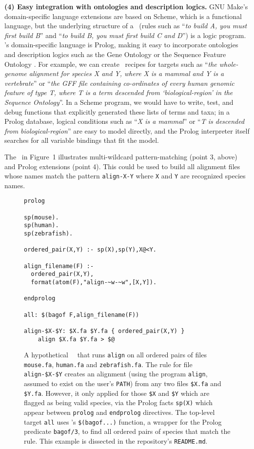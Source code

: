 {\bf (4) Easy integration with ontologies and description logics.}
GNU Make's domain-specific language extensions are based on Scheme, which is a functional language,
but the underlying structure of a \Makefile\ (rules such as ``{\em to build A, you must first build B}'' and ``{\em to build B, you must first build C and D}'')
is a logic program.
\biomake's domain-specific language is Prolog, making it easy to incorporate ontologies and description logics
such as the Gene Ontology \citep{GeneOntology2015} or the Sequence Feature Ontology \citep{SequenceOntology2005}.
For example, we can create \biomake\ recipes for targets such as ``{\em the whole-genome alignment for species X and Y, where X is a mammal and Y is a vertebrate}''
or ``{\em the GFF file containing co-ordinates of every human genomic feature of type T, where T is a term descended from `biological-region' in the Sequence Ontology}''.
In a Scheme program, we would have to write, test, and debug functions that explicitly generated these lists of terms and taxa;
in a Prolog database, logical conditions such as ``{\em X is a mammal}'' or ``{\em T is descended from biological-region}'' are easy to model directly,
and the Prolog interpreter itself searches for all variable bindings that fit the model.

The \Makefile\ in Figure~1 illustrates multi-wildcard pattern-matching (point 3, above) and Prolog extensions (point 4).
This could be used to build all alignment files whose names match the pattern {\tt align-X-Y} where {\tt X} and {\tt Y} are recognized species names.

\begin{figure}[H]
\begin{Verbatim}[frame=single]
prolog

sp(mouse).
sp(human).
sp(zebrafish).

ordered_pair(X,Y) :- sp(X),sp(Y),X@<Y.

align_filename(F) :-
  ordered_pair(X,Y),
  format(atom(F),"align-~w-~w",[X,Y]).

endprolog

all: $(bagof F,align_filename(F))

align-$X-$Y: $X.fa $Y.fa { ordered_pair(X,Y) }
    align $X.fa $Y.fa > $@
\end{Verbatim}
\caption{
  A hypothetical \biomake\ \Makefile\ that runs {\tt align} on all ordered pairs of files
  {\tt mouse.fa}, {\tt human.fa} and {\tt zebrafish.fa}.
The rule for file {\tt align-\$X-\$Y} creates an alignment (using the program {\tt align}, assumed to exist on the user's {\tt PATH})
from any two files {\tt \$X.fa} and {\tt \$Y.fa}.
However, it only applied for those {\tt \$X} and {\tt \$Y} which are flagged as being valid species, via the Prolog facts {\tt sp(X)}
which appear between {\tt prolog} and {\tt endprolog} directives.
The top-level target {\tt all} uses \biomake's {\tt \$(bagof...)} function, a wrapper for the Prolog predicate {\tt bagof/3},
to find all ordered pairs of species that match the rule.
This example is dissected in the repository's {\tt README.md}.
}
\end{figure}

